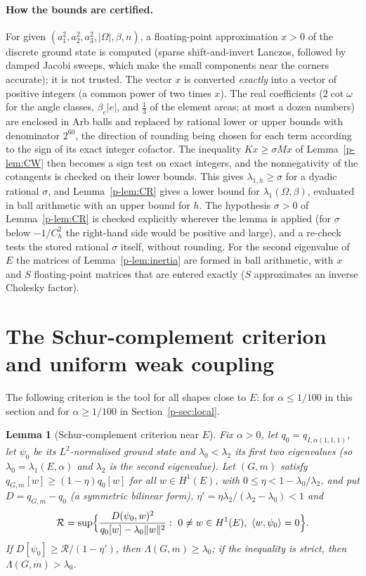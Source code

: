 \documentclass[11pt]{article}
\newtheorem{lemma}[theorem]{Lemma}
\theoremstyle{remark}
\begin{document}
\paragraph{How the bounds are certified.} For given $(a_1^2,a_2^2,a_3^2,|\Omega|,\beta,n)$, a
floating-point approximation $x>0$ of the discrete ground state is computed (sparse
shift-and-invert Lanczos, followed by damped Jacobi sweeps, which make the small components
near the corners accurate); it is not trusted. The vector $x$ is converted \emph{exactly} into a
vector of positive integers (a common power of two times $x$). The real coefficients
($2\cot\omega$ for the angle classes, $\beta_e|e|$, and $\frac13$ of the element areas; at
most a dozen numbers) are enclosed in Arb balls \cite{Arb} and replaced by rational lower or
upper bounds with denominator $2^{60}$, the direction of rounding being chosen for each term
according to the sign of its exact integer cofactor. The inequality $Kx\ge\sigma Mx$ of
Lemma~\ref{p-lem:CW} then becomes a sign test on exact integers, and the nonnegativity of the
cotangents is checked on their lower bounds. This gives $\lambda_{1,h}\ge\sigma$ for a dyadic
rational $\sigma$, and Lemma~\ref{p-lem:CR} gives a lower bound for $\lambda_1(\Omega,\beta)$,
evaluated in ball arithmetic with an upper bound for $h$. The hypothesis $\sigma>0$ of
Lemma~\ref{p-lem:CR} is checked explicitly wherever the lemma is applied (for $\sigma$ below
$-1/C_h^2$ the right-hand side would be positive and large), and a re-check tests the stored
rational $\sigma$ itself, without rounding. For the second eigenvalue of $E$ the
matrices of Lemma~\ref{p-lem:inertia} are formed in ball arithmetic, with $x$ and $S$
floating-point matrices that are entered exactly ($S$ approximates an inverse Cholesky factor).


\section{The Schur-complement criterion and uniform weak coupling}\label{p-sec:uniform}

The following criterion is the tool for all shapes close to $E$: for $\alpha\le1/100$ in this
section and for $\alpha\ge1/100$ in Section~\ref{p-sec:local}.

\begin{lemma}[Schur-complement criterion near $E$]\label{p-lem:schur}
Fix $\alpha>0$, let $q_0=q_{I,\alpha(1,1,1)}$, let $\psi_0$ be its $L^2$-normalised ground state
and $\lambda_0<\lambda_2$ its first two eigenvalues (so $\lambda_0=\lambda_1(E,\alpha)$ and
$\lambda_2$ is the second eigenvalue). Let $(G,m)$ satisfy
$q_{G,m}[w]\ge(1-\eta)q_0[w]$ for all $w\in H^1(E)$, with $0\le\eta<1-\lambda_0/\lambda_2$, and put
$D=q_{G,m}-q_0$ (a symmetric bilinear form), $\eta'=\eta\lambda_2/(\lambda_2-\lambda_0)<1$ and
\[
  \mathcal R=\sup\Bigl\{\frac{D(\psi_0,w)^2}{q_0[w]-\lambda_0\|w\|^2}:\ 0\ne w\in H^1(E),\
  \langle w,\psi_0\rangle=0\Bigr\}.
\]
If $D[\psi_0]\ge\mathcal R/(1-\eta')$, then $\Lambda(G,m)\ge\lambda_0$; if the inequality is
strict, then $\Lambda(G,m)>\lambda_0$.
\end{lemma}
\end{document}
